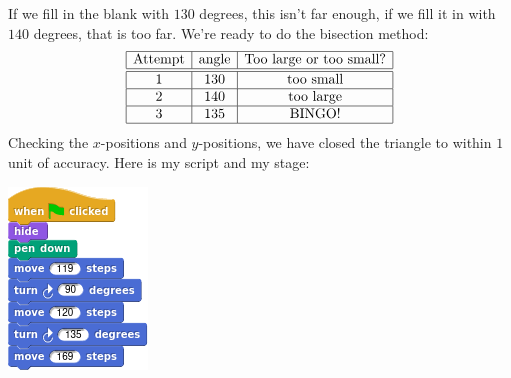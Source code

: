 \documentclass[noauthor,nooutcomes,12pt]{ximera}
\begin{document}
\begin{question}
\begin{freeResponse}
\begin{description}
\begin{center}
        \end{center}
        If we fill in the blank with $130$ degrees, this isn't far
        enough, if we fill it in with $140$ degrees, that is too
        far. We're ready to do the bisection method:
        \[
        \begin{array}{|c|c|c|c|}\hline
          \text{Attempt} & \text{angle} & \text{Too large or too small?} \\ \hline\hline
          1 & 130 & \text{too small} \\ \hline
          2 & 140 & \text{too large}  \\ \hline
          3 & 135 & \text{BINGO!}  \\ \hline
        \end{array}
        \]
        Checking the $x$-positions and $y$-positions, we have closed
        the triangle to within $1$ unit of accuracy. Here is my script and my stage:
        \begin{center}
          \includegraphics[width=.3\textwidth]{119120169-script.png}   \qquad {}
        \end{center}






\end{description}
\end{freeResponse}
\end{question}
\end{document}
